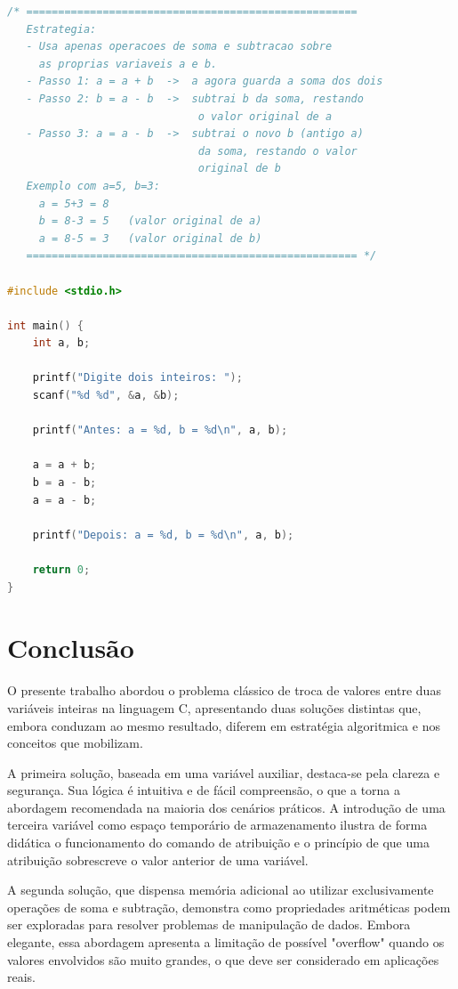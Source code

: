 \documentclass[12pt, a4paper]{article}
\begin{document}
\begin{lstlisting}[language=C, caption={Troca sem variável auxiliar}, label={lst:q2}]
/* ====================================================
   Estrategia:
   - Usa apenas operacoes de soma e subtracao sobre
     as proprias variaveis a e b.
   - Passo 1: a = a + b  ->  a agora guarda a soma dos dois
   - Passo 2: b = a - b  ->  subtrai b da soma, restando
                              o valor original de a
   - Passo 3: a = a - b  ->  subtrai o novo b (antigo a)
                              da soma, restando o valor
                              original de b
   Exemplo com a=5, b=3:
     a = 5+3 = 8
     b = 8-3 = 5   (valor original de a)
     a = 8-5 = 3   (valor original de b)
   ==================================================== */

#include <stdio.h>

int main() {
    int a, b;

    printf("Digite dois inteiros: ");
    scanf("%d %d", &a, &b);

    printf("Antes: a = %d, b = %d\n", a, b);

    a = a + b;
    b = a - b;
    a = a - b;

    printf("Depois: a = %d, b = %d\n", a, b);

    return 0;
}
\end{lstlisting}

\section*{Conclusão}


O presente trabalho abordou o problema clássico de troca de valores entre duas variáveis inteiras na linguagem C, apresentando duas soluções distintas que, embora conduzam ao mesmo resultado, diferem em estratégia algoritmica e nos conceitos que mobilizam.

       
A primeira solução, baseada em uma variável auxiliar, destaca-se pela clareza e segurança. Sua lógica é intuitiva e de fácil compreensão, o que a torna a abordagem recomendada na maioria dos cenários práticos. A introdução de uma terceira variável como espaço temporário de armazenamento ilustra de forma didática o funcionamento do comando de atribuição e o princípio de que uma atribuição sobrescreve o valor anterior de uma variável.


A segunda solução, que dispensa memória adicional ao utilizar exclusivamente operações de soma e subtração, demonstra como propriedades aritméticas podem ser exploradas para resolver problemas de manipulação de dados. Embora elegante, essa abordagem apresenta a limitação de possível "overflow" quando os valores envolvidos são muito grandes, o que deve ser considerado em aplicações reais.
\end{document}

